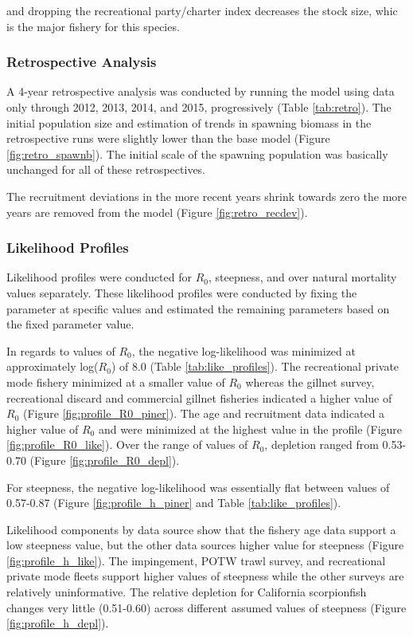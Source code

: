 \documentclass[12pt,]{article}
\begin{document}
and dropping the recreational party/charter index decreases the stock
size, whic is the major fishery for this species.

\subsubsection{Retrospective Analysis}\label{retrospective-analysis}

A 4-year retrospective analysis was conducted by running the model using
data only through 2012, 2013, 2014, and 2015, progressively (Table
\ref{tab:retro}). The initial population size and estimation of trends
in spawning biomass in the retrospective runs were slightly lower than
the base model (Figure \ref{fig:retro_spawnb}). The initial scale of the
spawning population was basically unchanged for all of these
retrospectives.

The recruitment deviations in the more recent years shrink towards zero
the more years are removed from the model (Figure
\ref{fig:retro_recdev}).

\subsubsection{Likelihood Profiles}\label{likelihood-profiles}

Likelihood profiles were conducted for \(R_0\), steepness, and over
natural mortality values separately. These likelihood profiles were
conducted by fixing the parameter at specific values and estimated the
remaining parameters based on the fixed parameter value.

In regards to values of \(R_0\), the negative log-likelihood was
minimized at approximately log(\(R_0\)) of 8.0 (Table
\ref{tab:like_profiles}). The recreational private mode fishery
minimized at a smaller value of \(R_0\) whereas the gillnet survey,
recreational discard and commercial gillnet fisheries indicated a higher
value of \(R_0\) (Figure \ref{fig:profile_R0_piner}). The age and
recruitment data indicated a higher value of \(R_0\) and were minimized
at the highest value in the profile (Figure \ref{fig:profile_R0_like}).
Over the range of values of \(R_0\), depletion ranged from 0.53-0.70
(Figure \ref{fig:profile_R0_depl}).

For steepness, the negative log-likelihood was essentially flat between
values of 0.57-0.87 (Figure \ref{fig:profile_h_piner} and Table
\ref{tab:like_profiles}).

Likelihood components by data source show that the fishery age data
support a low steepness value, but the other data sources higher value
for steepness (Figure \ref{fig:profile_h_like}). The impingement, POTW
trawl survey, and recreational private mode fleets support higher values
of steepness while the other surveys are relatively uninformative. The
relative depletion for California scorpionfish changes very little
(0.51-0.60) across different assumed values of steepness (Figure
\ref{fig:profile_h_depl}).
\end{document}
